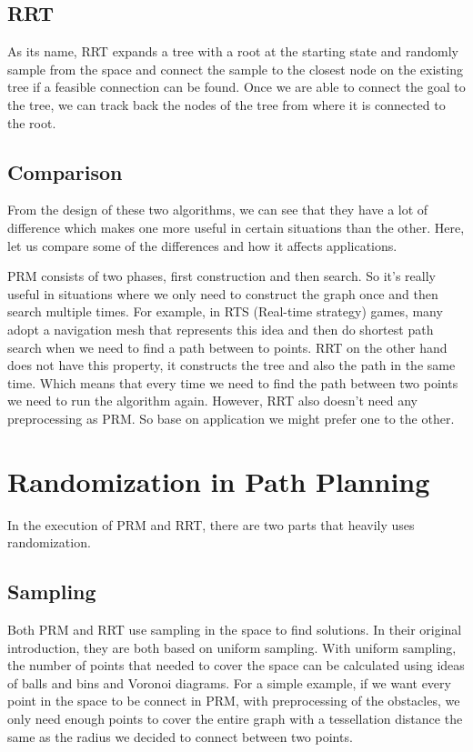 \documentclass[12pt]{article}
\begin{document}
\subsection*{RRT}
As its name, RRT expands a tree with a root at the starting state and randomly sample from the space and connect the sample to the closest node on the existing tree if a feasible connection can be found. Once we are able to connect the goal to the tree, we can track back the nodes of the tree from where it is connected to the root. 

\subsection*{Comparison}
From the design of these two algorithms, we can see that they have a lot of difference which makes one more useful in certain situations than the other. Here, let us compare some of the differences and how it affects applications.

PRM consists of two phases, first construction and then search. So it's really useful in situations where we only need to construct the graph once and then search multiple times. For example, in RTS (Real-time strategy) games, many adopt a navigation mesh that represents this idea and then do shortest path search when we need to find a path between to points. RRT on the other hand does not have this property, it constructs the tree and also the path in the same time. Which means that every time we need to find the path between two points we need to run the algorithm again. However, RRT also doesn't need any preprocessing as PRM. So base on application we might prefer one to the other. 

\section*{Randomization in Path Planning}
In the execution of PRM and RRT, there are two parts that heavily uses randomization. 

\subsection*{Sampling}
Both PRM and RRT use sampling in the space to find solutions. In their original introduction, they are both based on uniform sampling. With uniform sampling, the number of points that needed to cover the space can be calculated using ideas of balls and bins and Voronoi diagrams. For a simple example, if we want every point in the space to be connect in PRM, with preprocessing of the obstacles, we only need enough points to cover the entire graph with a tessellation distance the same as the radius we decided to connect between two points. 
\end{document}
